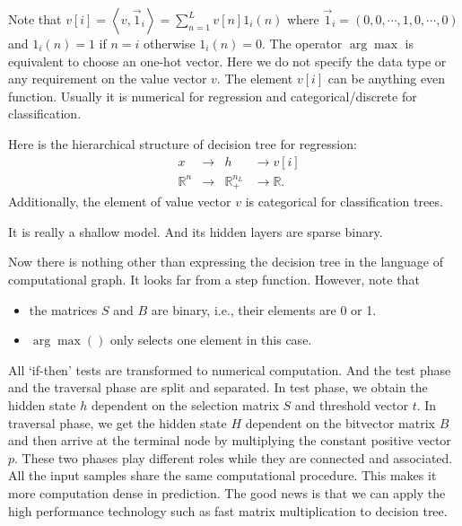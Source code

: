 \documentclass[UTF8]{article}
\begin{document}
Note that $v[i]=\left<v,  \vec 1_i\right>=\sum_{n=1}^{L}v[n] 1_i(n)$
where $\vec 1_i=(0,0,\cdots,1,0,\cdots, 0)$
and $1_i(n)=1$ if $n=i$ otherwise $1_i(n)=0$.
The operator $\arg\max$ is equivalent to choose an one-hot vector.
Here we do not specify the data type or any requirement on the value vector $v$.
The element $v[i]$ can be anything even function.
Usually it is numerical for regression and
categorical/discrete for classification.


Here is the hierarchical  structure of decision tree for regression:
\begin{equation}
\begin{aligned}
&x            &\to &h &\to v[i]\\ \nonumber
&\mathbb{R}^n &\to &\mathbb{R}_{+}^{n_L}&\to \mathbb{R}. \nonumber
\end{aligned}
\end{equation}
Additionally, the element of value vector $v$ is categorical for classification trees.

It is really a shallow model.
And its hidden layers are sparse binary.

Now there is nothing other than expressing the decision tree in the language of computational graph.
It looks  far from a step function. However, note that
\begin{itemize}
\item the matrices $S$ and $B$ are binary, i.e., their elements are 0 or 1.
\item $\arg\max()$ only selects one element in this case.
\end{itemize}
All `if-then' tests are transformed to numerical computation.
And the test phase and the traversal phase are split and separated.
In test phase, we obtain the hidden state $h$ dependent on the selection matrix $S$ and threshold vector $t$.
In traversal phase, we get the hidden state $H$ dependent on the bitvector matrix $B$
and then arrive at the terminal node by multiplying the constant positive vector $p$.
These two phases play different roles while they are connected and associated.
All the input samples share the same computational procedure.
This makes it more computation dense in prediction.
The good news is that we can apply the high performance technology such as fast matrix multiplication
to decision tree.
\end{document}
